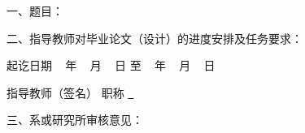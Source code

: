 % 		


{


{
	\bfseries {}
	\noindent \par
	\noindent \par 一、题目：\Title \
	\noindent \par 二、指导教师对毕业论文（设计）的进度安排及任务要求：

}
{
    \vskip 20mm
}
{
	\bfseries {}
	\noindent \par 起讫日期 ~ 年 ~  月 ~  日 \quad 至 \quad ~  年 ~  月  ~ 日
	
    \begin{flushright}
		指导教师（签名） \underline{{\quad}\AdvisorName{\quad}} 职称 \underline{{\quad}~{\quad}}
	\end{flushright}
}
{
    \bfseries {}
    \noindent \par 三、系或研究所审核意见：

}
{
    \vskip 20mm
}
{
\mbox{} \vfill
\bfseries{\signature{负责人（签名）}}
}
}
